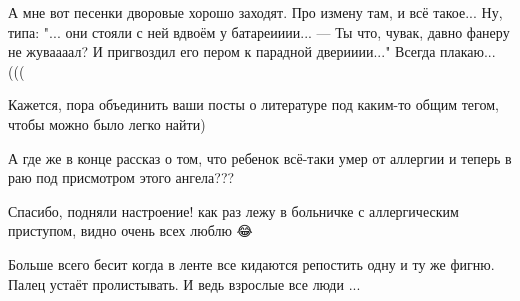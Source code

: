 \begin{itemize}
 
А мне вот песенки дворовые хорошо заходят. Про измену там, и всё такое... Ну, типа: "... они стояли с ней вдвоём у батареииии... — Ты что, чувак, давно фанеру не жуваааал?
И пригвоздил его пером к парадной дверииии..."
Всегда плакаю... (((

 
Кажется, пора объединить ваши посты о литературе под каким-то общим тегом, чтобы можно было легко найти)

 
А где же в конце рассказ о том, что ребенок всё-таки умер от аллергии и теперь в раю под присмотром этого ангела???

 
Спасибо, подняли настроение! как раз лежу в больничке с аллергическим приступом, видно очень всех люблю 😂

 
Больше всего бесит когда в ленте все кидаются репостить одну и ту же фигню. Палец устаёт пролистывать. И ведь взрослые все люди ...

 


\end{itemize}
